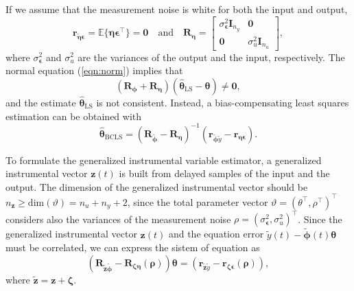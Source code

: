\documentclass[11pt]{article}
\begin{document}
\begin{itemize}
\begin{itemize}
        If we assume that the measurement noise is white for both the input and output, 
        \begin{equation} \tag{4.31} \mathbf{r}_{\widetilde{\bm{\eta}} \bm{\epsilon}} = \mathbb{E}\{ \bm{\eta} \bm{\epsilon}^\top \} = \mathbf{0} \quad \mathrm{and} \quad \mathbf{R}_{\bm{\eta}} = \begin{bmatrix} \sigma_{\bm{\epsilon}}^2 \mathbf{I}_{n_y} & \mathbf{0} \\ \mathbf{0} & \sigma_u^2 \mathbf{I}_{n_u} \end{bmatrix}, \end{equation} 
        where $\sigma_{\bm{\epsilon}}^2$ and $\sigma_u^2$ are the variances of the output and the input, respectively. The normal equation (\ref{eqn:norm}) implies that 
        \begin{equation} \tag{4.32} \left( \mathbf{R}_{\bm{\phi}} + \mathbf{R}_{\bm{\eta}} \right)  \left( \widehat{\bm{\theta}}_{\mathrm{LS}} - \bm{\theta} \right) \neq \mathbf{0}, \end{equation}
        and the estimate $\widehat{\bm{\theta}}_{\mathrm{LS}}$ is not consistent.
        Instead, a bias-compensating least squares estimation can be obtained with  
        \begin{equation} \tag{4.33} \widehat{\bm{\theta}}_{\mathrm{BCLS}} = \left( \mathbf{R}_{\widetilde{\bm{\phi}}} - \mathbf{R}_{\bm{\eta}} \right)^{-1}  \left(  \mathbf{r}_{\widetilde{\bm{\phi}} \widetilde{y}} - \mathbf{r}_{\bm{\eta} \bm{\epsilon}} \right) . \end{equation}

        To formulate the generalized instrumental variable estimator, a generalized instrumental vector $\mathbf{z}(t)$ is built from delayed samples of the input and the output. 
        The dimension of the generalized instrumental vector should be $n_{\mathbf{z}} \geq \mathrm{dim} ( \vartheta ) = n_u + n_y + 2$, since the total parameter vector $\vartheta = \left( \theta^\top, \rho^\top \right)^\top$ considers also the variances of the measurement noise $\rho = \left( \sigma_{\bm{\epsilon}}^2, \sigma_u^2 \right)^\top$. 
        Since the generalized instrumental vector $\mathbf{z}(t)$ and the equation error $\widetilde{y}(t) - \widetilde{\bm{\phi}}(t) \bm{\theta}$ must be correlated, we can express the sistem of equation as 
        \begin{equation} \tag{4.34}\left( \mathbf{R}_{\widetilde{\mathbf{z}} \widetilde{\bm{\phi}}} - \mathbf{R}_{\bm{\zeta} \bm{\eta}} \left( \bm{\rho} \right) \right) \bm{\theta} = \left(  \mathbf{r}_{\widetilde{\mathbf{z}} \widetilde{y}} - \mathbf{r}_{\bm{\zeta} \bm{\epsilon}} \left( \bm{\rho} \right) \right) , \label{eqn:GIVE} \end{equation}
        where $\widetilde{\mathbf{z}} = \mathbf{z} + \bm{\zeta}$.


\end{itemize}
\end{itemize}
\end{document}
